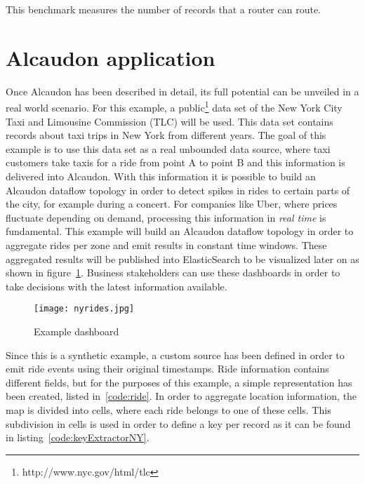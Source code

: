 This benchmark measures the number of records that a router can route.


\section{Alcaudon application}

Once Alcaudon has been described in detail, its full potential can be unveiled
in a real world scenario. For this example, a
public\footnote{http://www.nyc.gov/html/tlc} data set of the New York City Taxi
and Limousine Commission (TLC) will be used. This data set contains records
about taxi trips in New York from different years. The goal of this example is
to use this data set as a real unbounded data source, where taxi customers take
taxis for a ride from point A to point B and this information is delivered into
Alcaudon. With this information it is possible to build an Alcaudon dataflow
topology in order to detect spikes in rides to certain parts of the city, for
example during a concert. For companies like Uber, where prices fluctuate
depending on demand, processing this information in \textit{real time} is
fundamental. This example will build an Alcaudon dataflow topology in order to
aggregate rides per zone and emit results in constant time windows. These
aggregated results will be published into ElasticSearch to be visualized later
on as shown in figure~\ref{fig:rides}. Business stakeholders can use these
dashboards in order to take decisions with the latest information available.

\begin{figure}[!h]
\begin{center}
\texttt{[image: nyrides.jpg]}
\caption{Example dashboard}
\label{fig:rides}
\end{center}
\end{figure}

Since this is a synthetic example, a custom source has been defined in order to
emit ride events using their original timestamps. Ride information contains
different fields, but for the purposes of this example, a simple representation
has been created, listed in~\ref{code:ride}. In order to aggregate location
information, the map is divided into cells, where each ride belongs to one of
these cells. This subdivision in cells is used in order to define a key per
record as it can be found in listing~\ref{code:keyExtractorNY}.

